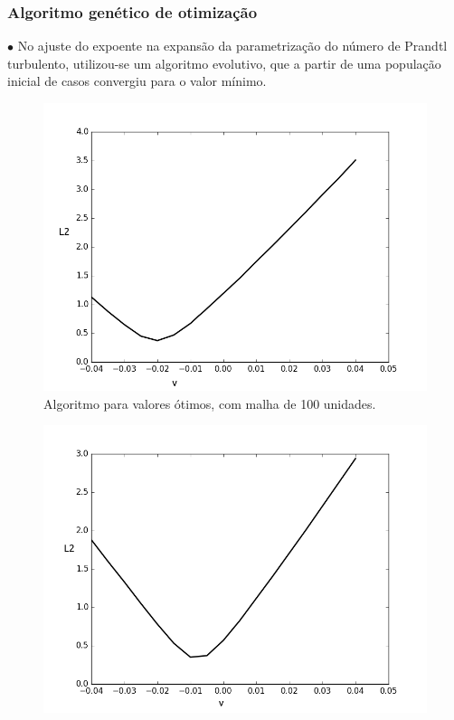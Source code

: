 \documentclass[xcolor=dvipsnames,10pt,aspectratio=169]{beamer}
\begin{document}
	
			\begin{frame}
	\frametitle{Algoritmo genético de otimização}
	$\bullet$ No ajuste do expoente na expansão da parametrização do número de Prandtl turbulento, utilizou-se um algoritmo evolutivo, que a partir de uma população inicial de casos convergiu para o valor mínimo.\\ 
	\begin{minipage}[h!]{0.24\textwidth}
		\begin{figure}
			\centering
			\includegraphics[angle=0, scale=0.20]{A100}
			\caption{Algoritmo para valores ótimos, com malha de 100 unidades.}
		\end{figure}
	\end{minipage}\hfill
	\begin{minipage}[h!]{0.24\textwidth}
		\begin{figure}
			\centering
			\includegraphics[angle=0, scale=0.20]{A400}

\end{figure}
\end{minipage}
\end{frame}
\end{document}
